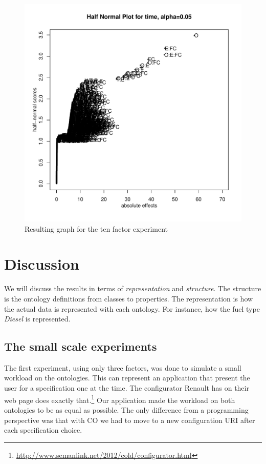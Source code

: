 \documentclass{llncs}
\begin{document}
\begin{figure}
 \includegraphics[width=14cm]{10factorAvarageDanielPlot.pdf}
  \caption{Resulting graph for the ten factor experiment}\label{10factorGraph}
\end{figure}

\section{Discussion}

We will discuss the results in terms of \textit{representation} and
\textit{structure}. The structure is the ontology definitions from
classes to properties.  The representation is how the actual data is
represented with each ontology. For instance, how the fuel type
\textit{Diesel} is represented.

\subsection{The small scale experiments}
The first experiment, using only three factors, was done to simulate a
small workload on the ontologies. This can represent an application
that present the user for a specification one at the time. The
configurator Renault has on their web page does exactly
that.\footnote{\url{http://www.semanlink.net/2012/cold/configurator.html}}
Our application made the workload on both ontologies to be as equal as
possible.  The only difference from a programming perspective was that
with CO we had to move to a new configuration URI after each
specification choice.
\end{document}
